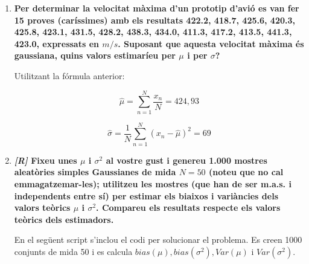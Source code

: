 \documentclass[a4paper]{article}
\begin{document}
\begin{enumerate}
\item \textbf{Per determinar la velocitat màxima d'un prototip d'avió es van fer 15 proves (caríssimes) amb els resultats 422.2, 418.7, 425.6, 420.3, 425.8, 423.1, 431.5, 428.2, 438.3, 434.0, 411.3, 417.2, 413.5, 441.3, 423.0, expressats en $m/s$. Suposant que aquesta velocitat màxima és gaussiana, quins valors estimaríeu per $\mu$ i per $\sigma$?}

Utilitzant la fórmula anterior: 

$$ \hat{\mu} = \sum_{n=1}^N \frac{x_n}{N} = 424,93 $$

$$ \hat{\sigma} = \frac{1}{N} \sum_{n=1}^N (x_n - \hat{\mu})^2 = 69 $$

\item \textbf{\emph{[R]} Fixeu unes $ \mu $ i $ \sigma^2 $ al vostre gust i genereu 1.000 mostres aleatòries simples Gaussianes de mida $ N = 50 $ (noteu que no cal emmagatzemar-les); utilitzeu les mostres (que han de ser m.a.s. i independents entre sí) per estimar els biaixos i variàncies dels valors teòrics $ \mu $ i $ \sigma^2 $. Compareu els resultats respecte els valors teòrics dels estimadors.}

En el següent script s'inclou el codi per solucionar el problema. Es creen 1000 conjunts de mida 50 i es calcula $ bias(\mu), bias(\sigma^2), Var(\mu)\text{ i } Var(\sigma^2)$.

\vspace{0.5cm}



\end{enumerate}
\end{document}
